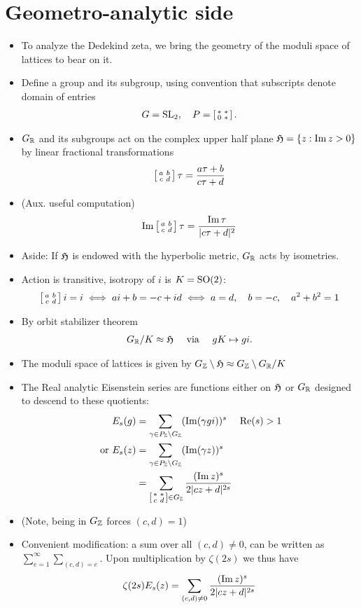 \documentclass[11pt]{amsart}
\begin{document}
\section{Geometro-analytic side}
\begin{itemize}
	\item To analyze the Dedekind zeta, we bring the geometry of the moduli space of lattices to bear on it. 
	\item Define a group and its subgroup, using convention that subscripts denote domain of entries
		\begin{align*}
			G=\operatorname{SL}_{2}, \quad P= \left[ \begin{smallmatrix} * & * \\ 0 & * \end{smallmatrix} \right].
		\end{align*}
	\item $G_{\mathbb{R}}$ and its subgroups act on the complex upper half plane $\mathfrak{H}=\{z:\operatorname{Im} z>0\}$ by linear fractional transformations
		\begin{align*}
			\left[ \begin{smallmatrix} a & b \\ c & d \end{smallmatrix} \right] \tau = \frac{a \tau +b}{c\tau +d}
		\end{align*}
	\item (Aux. useful computation) 
		\begin{align*}
			 \operatorname{Im} \left[ \begin{smallmatrix} a & b \\ c & d \end{smallmatrix} \right] \tau= \frac{\operatorname{Im} \tau}{ |c \tau +d|^{2}}
		\end{align*} 
	\item Aside: If $\mathfrak{H}$ is endowed with the hyperbolic metric, $G_{\mathbb{R}}$ acts by isometries. 
	\item Action is transitive, isotropy of $i$ is $K=\operatorname{SO}(2)$: 
		\begin{align*}
			\left[ \begin{smallmatrix} a & b \\ c & d \end{smallmatrix} \right] i= i \iff ai+b=-c + id  \iff a=d, \quad b=-c, \quad a^{2}+b^{2}=1
		\end{align*}
	\item By orbit stabilizer theorem
		\begin{align*}
			G_{\mathbb{R}}/K \approx \mathfrak{H}  \quad \text{ via } \quad  gK \mapsto gi. 
		\end{align*}
	\item The moduli space of lattices is given by $G_{\mathbb{Z}} \setminus \mathfrak{H} \approx G_{\mathbb{Z}} \setminus G_{\mathbb{R}} / K$
	\item The Real analytic Eisenstein series are functions either on $\mathfrak{H}$ or $G_{\mathbb{R}}$ designed to descend to these quotients: 
		\begin{align*}
			E_{s}(g)&= \sum_{\gamma \in P_{\mathbb{Z}} \setminus G_{\mathbb{Z}} } (\operatorname{Im}(\gamma g i))^{s}   \quad \text{ $\operatorname{Re}(s)>1$}\\ 
			\text{ or }E_{s}(z)&= \sum_{\gamma \in P_{\mathbb{Z}}\setminus G_{\mathbb{Z}}}(\operatorname{Im}(\gamma z))^{s} \\
						  &= \sum_{\left[ \begin{smallmatrix} * & * \\ c & d \end{smallmatrix} \right] \in G_{\mathbb{Z}} }  \frac{(\operatorname{Im} z)^{s}}{2|cz+d|^{2s}} 
		\end{align*}
	\item (Note, being in $G_{\mathbb{Z}}$ forces $(c,d)=1$)
	\item Convenient modification: a sum over all $(c,d)\neq 0$, can be written as $\sum_{e=1}^{\infty}\sum_{(c,d)=e}$. Upon multiplication by $\zeta(2s)$ we thus have
		\begin{align*}
			\zeta(2s)E_{s}(z)=\sum_{(c,d) \neq 0} \frac{(\operatorname{Im} z)^{s}}{2|cz+d|^{2s}}
		\end{align*} 
\end{itemize}
\end{document}
